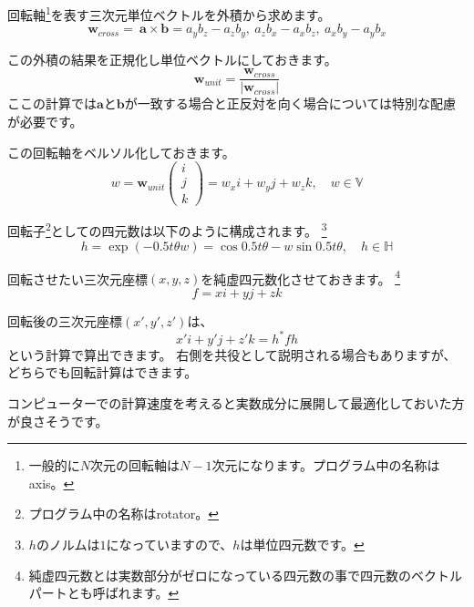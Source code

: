\documentclass[a4paper,12pt,notitlepage]{jsreport}
\begin{document}
回転軸\footnote{一般的に$N$次元の回転軸は$N-1$次元になります。プログラム中の名称はaxis。}を表す三次元単位ベクトルを外積から求めます。
\begin{equation}
  \bm{w}_{cross}=~\bm{a}\times\bm{b}=a_yb_z-a_zb_y,~a_zb_x-a_xb_z,~a_xb_y-a_yb_x
\end{equation}

この外積の結果を正規化し単位ベクトルにしておきます。
\begin{equation}
  \bm{w}_{unit}=\frac{\bm{w}_{cross}}{|\bm{w}_{cross}|}
\end{equation}
ここの計算では$\bm{a}$と$\bm{b}$が一致する場合と正反対を向く場合については特別な配慮が必要です。

この回転軸をベルソル化しておきます。
\begin{equation}
  w=\bm{w}_{unit}\begin{pmatrix}i\\j\\k\end{pmatrix}=w_xi+w_yj+w_zk,\quad w\in\mathbb{V}
\end{equation}

回転子\footnote{プログラム中の名称はrotator。}としての四元数は以下のように構成されます。
\footnote{$h$のノルムは$1$になっていますので、$h$は単位四元数です。}
\begin{equation}
  h=\exp(-0.5t\theta w)=\cos 0.5t\theta-w\sin 0.5t\theta,\quad h\in\mathbb{H}
\end{equation}

回転させたい三次元座標$(x,y,z)$を純虚四元数化させておきます。
\footnote{純虚四元数とは実数部分がゼロになっている四元数の事で四元数のベクトルパートとも呼ばれます。}
\begin{equation}
  f=xi+yj+zk
\end{equation}

回転後の三次元座標$(x',y',z')$は、
\begin{equation}
  x'i+y'j+z'k=h^*fh
\end{equation}
という計算で算出できます。
右側を共役として説明される場合もありますが、どちらでも回転計算はできます。

コンピューターでの計算速度を考えると実数成分に展開して最適化しておいた方が良さそうです。
\end{document}
